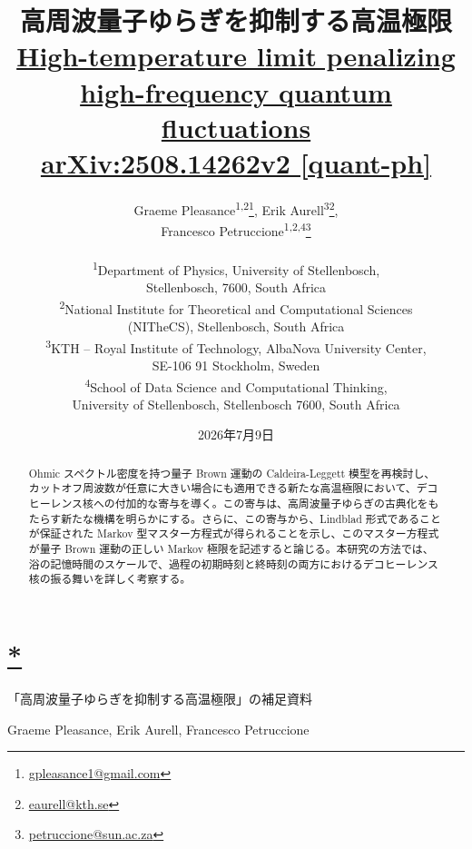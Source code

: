 \documentclass[a4paper,11pt]{ltjsarticle}
\title{\bfseries 高周波量子ゆらぎを抑制する高温極限\\[0.5em]
\large\href{https://journals.aps.org/prl/abstract/10.1103/kp9j-v4ss}{High-temperature limit penalizing high-frequency quantum fluctuations}\\[0.5em]
\normalsize\href{https://arxiv.org/pdf/2508.14262v2}{arXiv:2508.14262v2 [quant-ph]}}
\author{%
Graeme Pleasance\textsuperscript{1,2}\thanks{\href{mailto:gpleasance1@gmail.com}{gpleasance1@gmail.com}},
Erik Aurell\textsuperscript{3}\thanks{\href{mailto:eaurell@kth.se}{eaurell@kth.se}},\\
Francesco Petruccione\textsuperscript{1,2,4}\thanks{\href{mailto:petruccione@sun.ac.za}{petruccione@sun.ac.za}}\\[0.6em]
\parbox{0.96\textwidth}{\centering\small
\textsuperscript{1}Department of Physics, University of Stellenbosch,\\
Stellenbosch, 7600, South Africa\\[0.25em]
\textsuperscript{2}National Institute for Theoretical and Computational Sciences\\
(NITheCS), Stellenbosch, South Africa\\[0.25em]
\textsuperscript{3}KTH -- Royal Institute of Technology, AlbaNova University Center,\\
SE-106 91 Stockholm, Sweden\\[0.25em]
\textsuperscript{4}School of Data Science and Computational Thinking,\\
University of Stellenbosch, Stellenbosch 7600, South Africa}}
\date{2026年7月9日}
\newcommand{\sectionlink}[1]{\section[#1]{\hyperlink{toc}{#1}}}
\numberwithin{equation}{section}
\begin{document}

\maketitle
\begin{abstract}
Ohmic スペクトル密度を持つ量子 Brown 運動の Caldeira-Leggett 模型を再検討し、カットオフ周波数が任意に大きい場合にも適用できる新たな高温極限において、デコヒーレンス核への付加的な寄与を導く。この寄与は、高周波量子ゆらぎの古典化をもたらす新たな機構を明らかにする。さらに、この寄与から、Lindblad 形式であることが保証された Markov 型マスター方程式が得られることを示し、このマスター方程式が量子 Brown 運動の正しい Markov 極限を記述すると論じる。本研究の方法では、浴の記憶時間のスケールで、過程の初期時刻と終時刻の両方におけるデコヒーレンス核の振る舞いを詳しく考察する。
\end{abstract}
\clearpage
\hypertarget{toc}{}
\tableofcontents
\clearpage

\clearpage
\renewcommand{\refname}{\hyperlink{toc}{参考文献}}


\clearpage
\sectionlink*{「高周波量子ゆらぎを抑制する高温極限」の補足資料}
\begin{center}
Graeme Pleasance, Erik Aurell, Francesco Petruccione
\end{center}


\end{document}
